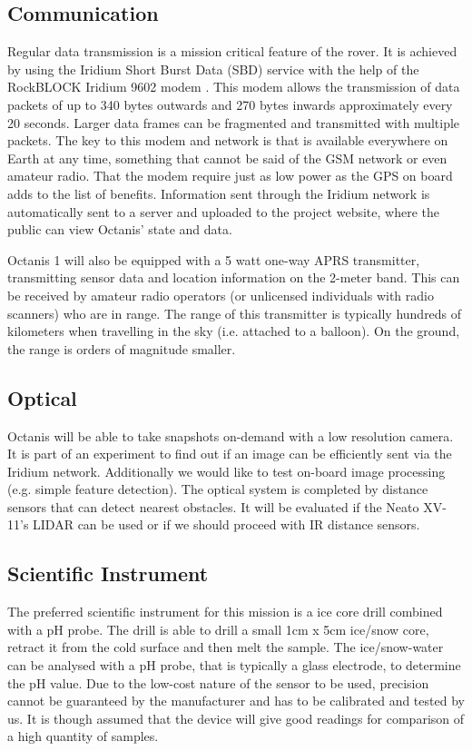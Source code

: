 \documentclass[a4paper,12pt]{article}
\begin{document}
\subsection{Communication}
Regular data transmission is a mission critical feature of the rover. It is achieved by using the Iridium Short Burst Data (SBD) service with the help of the RockBLOCK Iridium 9602 modem \cite{iridium}. This modem allows the transmission of data packets of up to 340 bytes outwards and 270 bytes inwards approximately every 20 seconds. Larger data frames can be fragmented and transmitted with multiple packets. The key to this modem and network is that is available everywhere on Earth at any time, something that cannot be said of the GSM network or even amateur radio. That the modem require just as low power as the GPS on board adds to the list of benefits. Information sent through the Iridium network is automatically sent to a server and uploaded to the project website, where the public can view Octanis' state and data.

Octanis 1 will also be equipped with a 5 watt one-way APRS transmitter, transmitting sensor data and location information on the 2-meter band. This can be received by amateur radio operators (or unlicensed individuals with radio scanners) who are in range. The range of this transmitter is typically hundreds of kilometers when travelling in the sky (i.e. attached to a balloon). On the ground, the range is orders of magnitude smaller.


\subsection{Optical}
Octanis will be able to take snapshots on-demand with a low resolution camera. It is part of an experiment to find out if an image can be efficiently sent via the Iridium network. Additionally we would like to test on-board image processing (e.g. simple feature detection). The optical system is completed by distance sensors that can detect nearest obstacles. It will be evaluated if the Neato XV-11's LIDAR \cite{lidar} can be used or if we should proceed with IR distance sensors.


\subsection{Scientific Instrument}
The preferred scientific instrument for this mission is a ice core drill combined with a pH probe. The drill is able to drill a small 1cm x 5cm ice/snow core, retract it from the cold surface and then melt the sample. The ice/snow-water can be analysed with a pH probe, that is typically a glass electrode, to determine the pH value. Due to the low-cost nature of the sensor to be used, precision cannot be guaranteed by the manufacturer and has to be calibrated and tested by us. It is though assumed that the device will give good readings for comparison of a high quantity of samples.
\end{document}
